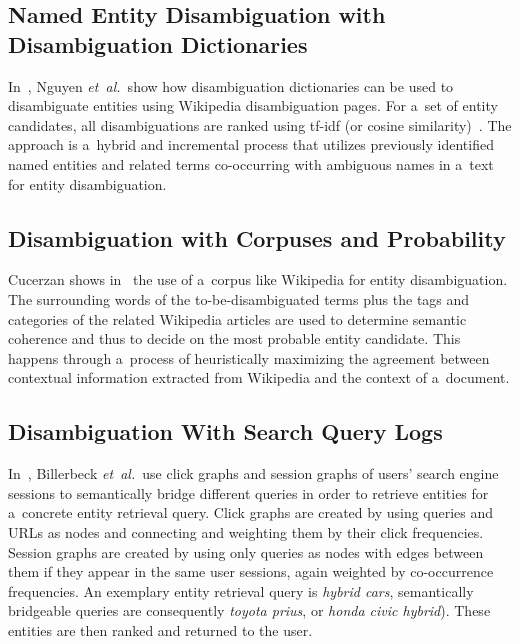 \subsection{Named Entity Disambiguation with Disambiguation Dictionaries}

In~\cite{nguyen2008namedentity},
Nguyen \emph{et~al.}\ show how disambiguation dictionaries
can be used to disambiguate entities
using Wikipedia disambiguation pages.
For a~set of entity candidates, all disambiguations are ranked
using tf-idf (or cosine similarity)~\cite{manning2008ir}.
The approach is a~hybrid and incremental process
that utilizes previously identified named entities
and related terms co-occurring with ambiguous names
in a~text for entity disambiguation.

\subsection{Disambiguation with Corpuses and Probability}

Cucerzan shows in~\cite{cucerzan2007largescale}
the use of a~corpus like Wikipedia for entity disambiguation.
The surrounding words of the to-be-disambiguated terms
plus the tags and categories of the related Wikipedia articles
are used to determine semantic coherence and thus
to decide on the most probable entity candidate.
This happens through a~process of heuristically maximizing
the agreement between contextual information
extracted from Wikipedia and the context of a~document.

\subsection{Disambiguation With Search Query Logs}

In~\cite{billerbeck2010rankingentities}, Billerbeck \emph{et~al.}\ use
click graphs and session graphs
of users' search engine sessions
to semantically bridge different queries in order to
retrieve entities for a~concrete entity retrieval query.
Click graphs are created by using queries and URLs as nodes
and connecting and weighting them by their click frequencies.
Session graphs are created by using only queries as nodes
with edges between them if they appear in the same user sessions,
again weighted by co-occurrence frequencies.
An exemplary entity retrieval query is \emph{hybrid cars},
semantically bridgeable queries are consequently \emph{toyota prius},
or \emph{honda civic hybrid}).
These entities are then ranked and returned to the user.

